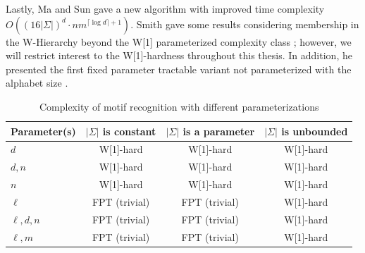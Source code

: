 Lastly, Ma and Sun \cite{MS08} gave a new algorithm with improved time complexity $O((16|\Sigma|)^d \cdot nm^{\lceil \log d \rceil  + 1})$.  Smith gave some results considering membership in the W-Hierarchy beyond the W[1] parameterized complexity class \cite{asmith}; however, we will restrict interest to the W[1]-hardness throughout this thesis. In addition, he presented the first fixed parameter tractable variant not parameterized with the alphabet size \cite{asmith}.  
 
\begin{table}[h]
\begin{center} 
\begin{tabular}{ l  c c c }
	\hline
  Parameter(s) 		& $|\Sigma|$ is constant 		& $|\Sigma|$ is a parameter		& $|\Sigma|$ is unbounded  \\
  \hline
  $d$					& W[1]-hard	\cite{FGN06}		& W[1]-hard	\cite{FGN06}			& W[1]-hard \cite{ESW03,FGN06} 				\\
  $d, n$				& W[1]-hard	\cite{FGN06}		& W[1]-hard	\cite{FGN06}			& W[1]-hard \cite{ESW03,FGN06} 				\\
  $n$					& W[1]-hard	\cite{FGN06}		& W[1]-hard \cite{FGN06}			& W[1]-hard \cite{ESW03,FGN06}				\\
  $\ell$					& FPT (trivial)							& FPT (trivial)								& W[1]-hard \cite{ESW03,FGN06}				\\
  $\ell, d, n$			& FPT (trivial)							& FPT (trivial)											& W[1]-hard \cite{ESW03,FGN06}				\\
  $\ell, m$			& FPT (trivial)							& FPT (trivial)											& W[1]-hard \cite{asmith}				\\
  \hline
\end{tabular} 
\end{center}
\caption{Complexity of motif recognition with different parameterizations}
\label{tab:fpt_motif_recogniton}
\end{table} 

